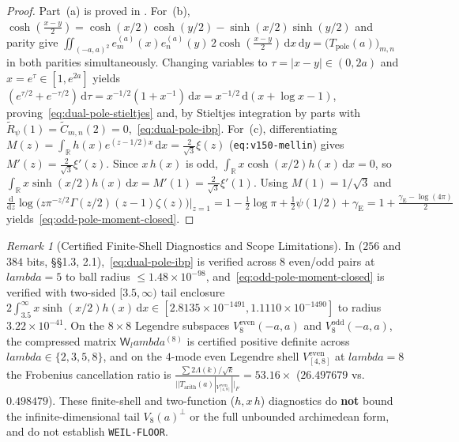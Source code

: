 \documentclass[11pt]{article}
\def\lambda{lambda}%
\def\norm#1{||#1||}%
\theoremstyle{remark}
\newtheorem{remark}[theorem]{Remark}
\newcommand{\norm}[1]{\left\lVert #1\right\rVert}
\newcommand{\dd}{\mathrm d}
\begin{document}
\begin{proof}
Part~(a) is proved in . For~(b), $\cosh(\frac{x-y}{2}) = \cosh(x/2)\cosh(y/2) - \sinh(x/2)\sinh(y/2)$ and parity give $\iint_{(-a,a)^2} e_m^{(a)}(x)e_n^{(a)}(y)\,2\cosh(\frac{x-y}{2})\,\dd x\,\dd y = \bigl(T_{\mathrm{pole}}(a)\bigr)_{m,n}$ in both parities simultaneously. Changing variables to $\tau = |x-y| \in (0,2a)$ and $x = e^\tau \in [1,e^{2a}]$ yields $(e^{\tau/2} + e^{-\tau/2})\,\dd\tau = x^{-1/2}(1 + x^{-1})\,\dd x = x^{-1/2}\,\dd(x + \log x - 1)$, proving~\eqref{eq:dual-pole-stieltjes} and, by Stieltjes integration by parts with $\widetilde{R}_\psi(1) = \widetilde{C}_{m,n}(2) = 0$,~\eqref{eq:dual-pole-ibp}. For~(c), differentiating $M(z) = \int_{\mathbb{R}} h(x)e^{(z-1/2)x}\,\dd x = \frac{2}{\sqrt{3}}\xi(z)$ (\texttt{eq:v150-mellin}) gives $M'(z) = \frac{2}{\sqrt{3}}\xi'(z)$. Since $x\,h(x)$ is odd, $\int_{\mathbb{R}} x\cosh(x/2)h(x)\,\dd x = 0$, so $\int_{\mathbb{R}} x\sinh(x/2)h(x)\,\dd x = M'(1) = \frac{2}{\sqrt{3}}\xi'(1)$. Using $M(1) = 1/\sqrt{3}$ and $\frac{\dd}{\dd z}\log\bigl(z\pi^{-z/2}\Gamma(z/2)(z-1)\zeta(z)\bigr)\big|_{z=1} = 1 - \tfrac{1}{2}\log\pi + \tfrac{1}{2}\psi(1/2) + \gamma_{\mathrm{E}} = 1 + \frac{\gamma_{\mathrm{E}} - \log(4\pi)}{2}$ yields~\eqref{eq:odd-pole-moment-closed}.
\end{proof}

\begin{remark}[Certified Finite-Shell Diagnostics and Scope Limitations]
In  ($256$ and $384$ bits,  \S\S1.3, 2.1),~\eqref{eq:dual-pole-ibp} is verified across $8$ even/odd pairs at $\lambda = 5$ to ball radius $\le 1.48 \times 10^{-98}$, and~\eqref{eq:odd-pole-moment-closed} is verified with two-sided $[3.5,\infty)$ tail enclosure $2\int_{3.5}^\infty x\sinh(x/2)h(x)\,\dd x \in [2.8135\times 10^{-1491}, 1.1110\times 10^{-1490}]$ to radius $3.22 \times 10^{-41}$. On the $8\times 8$ Legendre subspaces $V_8^{\mathrm{even}}(-a,a)$ and $V_8^{\mathrm{odd}}(-a,a)$, the compressed matrix $\mathsf{W}_\lambda^{(8)}$ is certified positive definite across $\lambda \in \{2,3,5,8\}$, and on the $4$-mode even Legendre shell $V_{[4,8]}^{\mathrm{even}}$ at $\lambda = 8$ the Frobenius cancellation ratio is $\frac{\sum 2\Lambda(k)/\sqrt{k}}{\norm{T_{\mathrm{arith}}(a)|_{V_{[4,8]}^{\mathrm{even}}}}_F} = 53.16\times$ ($26.497679$ vs.\ $0.498479$). These finite-shell and two-function ($h, x\,h$) diagnostics do \textbf{not} bound the infinite-dimensional tail $V_8(a)^\perp$ or the full unbounded archimedean form, and do not establish \texttt{WEIL-FLOOR}.
\end{remark}
\end{document}

